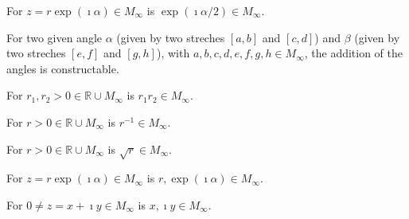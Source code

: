 \begin{lemma}
    \label{lem:construction_halving_angle}
    For $z = r \exp(\imath \alpha) \in M_{\infty}$ is $\exp(\imath \alpha / 2) \in M_{\infty}$.
\end{lemma}


\begin{lemma}
    \label{construction_add_angle}
    For two given angle $\alpha$ (given by two streches $[a,b]$ and $[c,d]$) and $\beta$ (given by two streches $[e,f]$ and $[g,h]$), with $ a,b,c,d,e,f,g,h \in M_{\infty}$, the addition of the angles is constructable.
\end{lemma}

\begin{lemma}
    \label{construction_mult_pos_real}
    For $r_1, r_2 > 0 \in \mathbb{R}\cup M_{\infty}$ is $r_1 r_2 \in M_{\infty}$.
\end{lemma}

\begin{lemma}
    \label{construction_inv_pos_real}
    For $r > 0\in \mathbb{R}\cup M_{\infty}$ is $r^{-1} \in M_{\infty}$.
\end{lemma}

\begin{lemma}
    \label{construction_sqrt_pos_real}
    For $r > 0 \in \mathbb{R}\cup M_{\infty}$ is $\sqrt{r} \in M_{\infty}$.
\end{lemma}

\begin{lemma}
    \label{construction_polar}
    For $z = r \exp(\imath \alpha) \in M_{\infty}$ is $r, \allowbreak \exp(\imath \alpha) \in M_{\infty}$.
\end{lemma}

\begin{lemma}
    \label{construction_re_im}
    For $0 \ne z = x + \imath y \in M_{\infty}$ is $x, \imath y \in M_{\infty}$.
\end{lemma}

